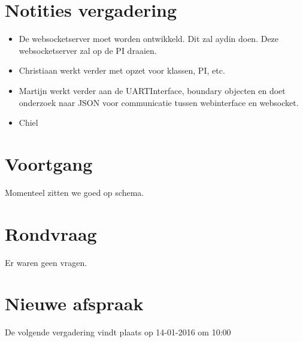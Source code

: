 \documentclass[dutch]{hu}
\begin{document}
\section{Notities vergadering}
\begin{itemize}

\item De websocketserver moet worden ontwikkeld. Dit zal aydin doen. Deze websocketserver zal op de PI draaien.
\item Christiaan werkt verder met opzet voor klassen, PI, etc.
\item Martijn werkt verder aan de UARTInterface, boundary objecten en doet onderzoek naar JSON voor communicatie tussen webinterface en websocket.
\item Chiel 

\end{itemize}

\section{Voortgang}
Momenteel zitten we goed op schema.

\section{Rondvraag}
Er waren geen vragen.

\section{Nieuwe afspraak}
De volgende vergadering vindt plaats op 14-01-2016 om 10:00
\end{document}
